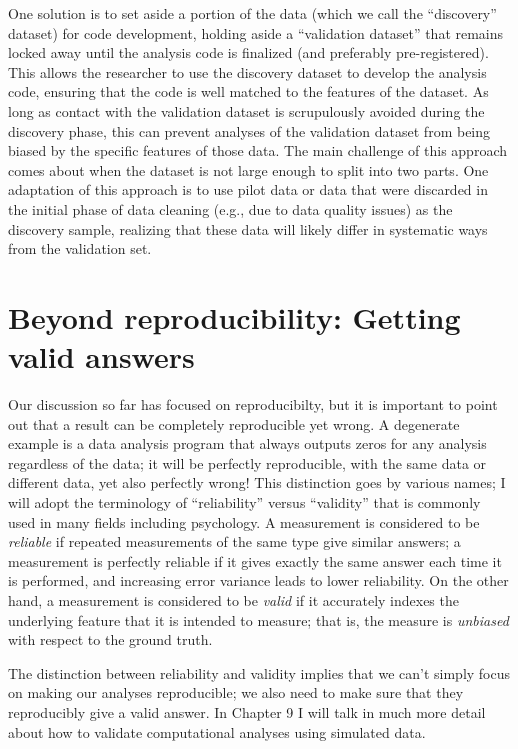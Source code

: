 One solution is to set aside a portion of the data (which we call the ``discovery'' dataset) for code development, holding aside a ``validation dataset'' that remains locked away until the analysis code is finalized (and preferably pre-registered).
This allows the researcher to use the discovery dataset to develop the analysis code, ensuring that the code is well matched to the features of the dataset.
As long as contact with the validation dataset is scrupulously avoided during the discovery phase, this can prevent analyses of the validation dataset from being biased by the specific features of those data.
The main challenge of this approach comes about when the dataset is not large enough to split into two parts.
One adaptation of this approach is to use pilot data or data that were discarded in the initial phase of data cleaning (e.g., due to data quality issues) as the discovery sample, realizing that these data will likely differ in systematic ways from the validation set.

\section{Beyond reproducibility: Getting valid answers}

Our discussion so far has focused on reproducibilty, but it is important to point out that a result can be completely reproducible yet wrong.
A degenerate example is a data analysis program that always outputs zeros for any analysis regardless of the data; it will be perfectly reproducible, with the same data or different data, yet also perfectly wrong! This distinction goes by various names; I will adopt the terminology of ``reliability'' versus ``validity'' that is commonly used in many fields including psychology.
A measurement is considered to be \textit{reliable} if repeated measurements of the same type give similar answers; a measurement is perfectly reliable if it gives exactly the same answer each time it is performed, and increasing error variance leads to lower reliability.
On the other hand, a measurement is considered to be \textit{valid} if it accurately indexes the underlying feature that it is intended to measure; that is, the measure is \textit{unbiased} with respect to the ground truth.

The distinction between reliability and validity implies that we can't simply focus on making our analyses reproducible; we also need to make sure that they reproducibly give a valid answer.
In Chapter 9 I will talk in much more detail about how to validate computational analyses using simulated data.

